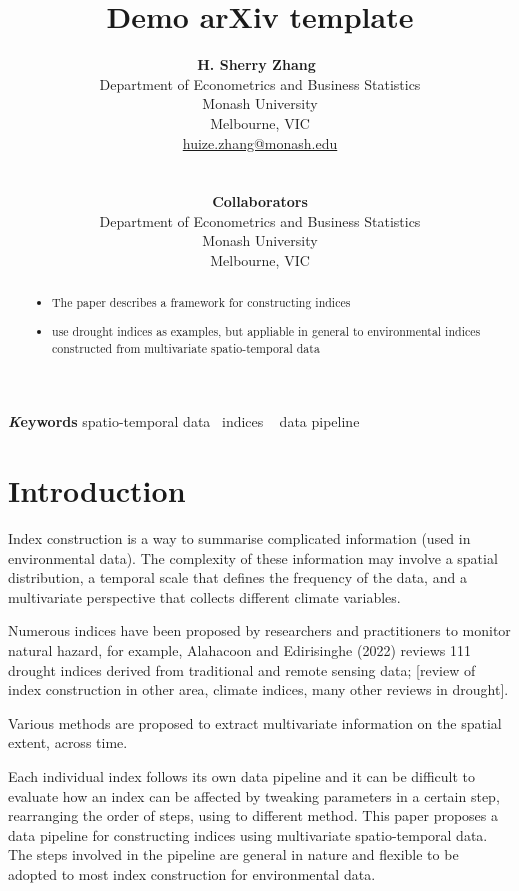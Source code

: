 \documentclass[
]{article}
\title{Demo arXiv template}
\author{
\textbf{H. Sherry Zhang}~\orcidlink{0000-0002-7122-1463}\\Department of
Econometrics and Business Statistics\\Monash University\\Melbourne,
VIC\\\href{mailto:huize.zhang@monash.edu}{huize.zhang@monash.edu}\\\\\\
\textbf{Collaborators}\\Department of Econometrics and Business
Statistics\\Monash University\\Melbourne, VIC\\}
\date{}
\providecommand{\tightlist}{%
  \setlength{\itemsep}{0pt}\setlength{\parskip}{0pt}}\usepackage{longtable,booktabs,array}
\begin{document}
\maketitle
\begin{abstract}
\begin{itemize}
\tightlist
\item
  The paper describes a framework for constructing indices
\item
  use drought indices as examples, but appliable in general to
  environmental indices constructed from multivariate spatio-temporal
  data
\end{itemize}
\end{abstract}
{\bfseries \emph Keywords}
\def\sep{\textbullet\ }
spatio-temporal data \sep indices \sep 
data pipeline

\ifdefined\Shaded\renewenvironment{Shaded}{\begin{tcolorbox}[interior hidden, borderline west={3pt}{0pt}{shadecolor}, boxrule=0pt, enhanced, breakable, sharp corners, frame hidden]}{\end{tcolorbox}}\fi

\hypertarget{introduction}{%
\section{Introduction}\label{introduction}}

Index construction is a way to summarise complicated information (used
in environmental data). The complexity of these information may involve
a spatial distribution, a temporal scale that defines the frequency of
the data, and a multivariate perspective that collects different climate
variables.

Numerous indices have been proposed by researchers and practitioners to
monitor natural hazard, for example, Alahacoon and Edirisinghe (2022)
reviews 111 drought indices derived from traditional and remote sensing
data; {[}review of index construction in other area, climate indices,
many other reviews in drought{]}.

Various methods are proposed to extract multivariate information on the
spatial extent, across time.

Each individual index follows its own data pipeline and it can be
difficult to evaluate how an index can be affected by tweaking
parameters in a certain step, rearranging the order of steps, using to
different method. This paper proposes a data pipeline for constructing
indices using multivariate spatio-temporal data. The steps involved in
the pipeline are general in nature and flexible to be adopted to most
index construction for environmental data.
\end{document}
